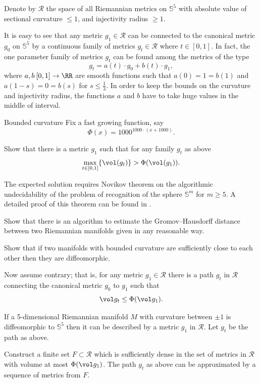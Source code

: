 Denote by $\mathcal{R}$ the space of 
all Riemannian metrics on $\mathbb S^5$
with absolute value of sectional curvature $\le1$,
and injectivity radius $\ge1$.

It is easy to see that any metric $g_1\in \mathcal{R}$ 
can be connected to the canonical metric $g_0$ on $\mathbb S^5$
by a continuous family of metrics $g_t\in \mathcal{R}$ where $t\in[0,1]$.
In fact, the one parameter family of metrics $g_t$
can be found among the metrics of the type 
\[g_t=a(t)\cdot g_0+b(t)\cdot g_1,\]
where $a,b\:[0,1]\to\RR$
are smooth functions such that $a(0)=1=b(1)$ and $a(1-s)=0=b(s)$ for $s\le \tfrac13$.
In order to keep the bounds on the curvature and injectivity radius,
the functions $a$ and $b$
have to take huge values in the middle of interval.

\begin{pr}{\thm}{Bounded curvature}\label{Bounded curvature}
Fix a fast growing function, say
\[\Phi(x)=1000^{1000\cdot (x+1000)}.\]

Show that there is a metric $g_1$ 
such that 
for any family $g_t$ as above
\[\max_{t\in[0,1]}\{\vol(g_t)\}
>
\Phi(\vol(g_1)).\]
\end{pr}

The expected solution requires Novikov theorem on the algorithmic undecidability of the problem of recognition of the sphere $\mathbb S^m$  for
$m\ge 5$. 
A detailed proof of this theorem can be found in \cite{nabutovsky-NovThm}.


Show that there is an algorithm to estimate the Gromov--Hausdorff distance between two Riemannian manifolds given in any reasonable way.

Show that if two manifolds with bounded curvature are sufficiently close to each other then they are diffeomorphic.

Now assume contrary;
that is, for any metric $g_1\in \mathcal{R}$ there is a path $g_t$ in $\mathcal{R}$
connecting the canonical metric $g_0$ to $g_1$ such that 
\[\vol g_t\le \Phi(\vol g_1).\]

If a 5-dimensional Riemannian manifold $M$ with curvature between $\pm1$ is diffeomorphic to $\mathbb{S}^5$ 
then it can be described by a metric $g_1$ in $\mathcal{R}$.
Let $g_t$ be the path as above.

Construct a finite set $F\subset \mathcal{R}$ 
which is sufficiently dense in the set of metrics in $\mathcal{R}$ with volume at most $\Phi(\vol g_1)$.
The path $g_t$ as above can be approximated by a sequence of metrics from $F$.

